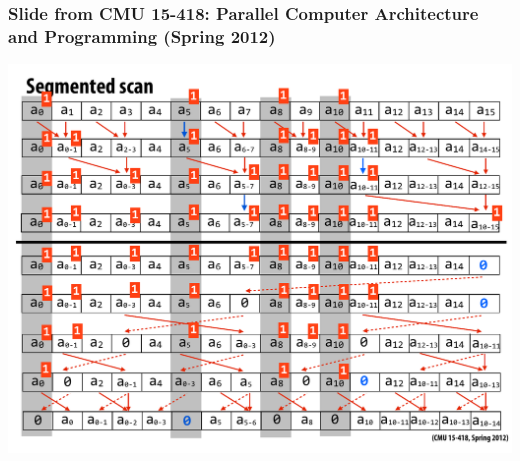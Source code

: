 \documentclass{beamer}
\begin{document}
\begin{frame}[fragile,t]
  \frametitle{{\scriptsize Slide from CMU 15-418: Parallel Computer Architecture and Programming (Spring 2012)}}
\vspace{-3ex}
\begin{center}
\includegraphics[height=50ex]{Figures/SegmExclScan} 
\end  {center}

\end{frame}
\end{document}
